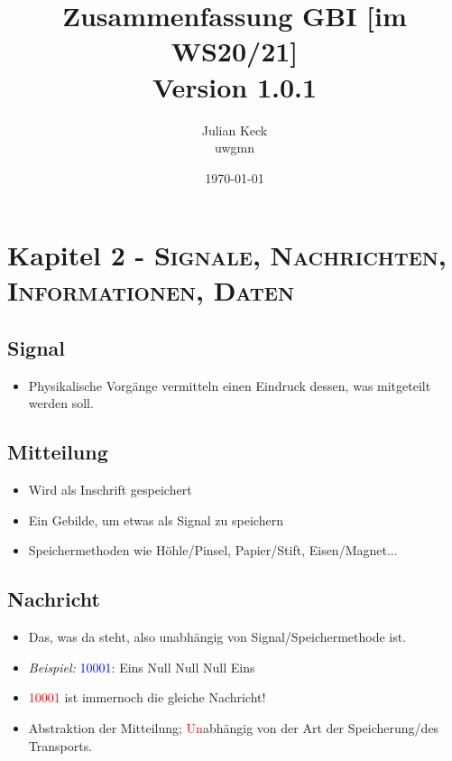 \documentclass{article}
\newcommand{\version}{1.0.1}
\newcommand{\subtitlerelsize}{1} %
\newcommand{\subtitlelinesep}{0.1em} %
\newcommand{\kapitel}[2]{Kapitel #1 - \textsc{#2}}
\newcommand{\blue}[1]{\textcolor{blue}{#1}}
\newcommand{\red}[1]{\textcolor{red}{#1}}
\newcommand{\example}[1]{\textit{Beispiel: }#1}
\begin{document}
\title{Zusammenfassung GBI [im WS20/21]\\[\subtitlelinesep]%
    \smaller[\subtitlerelsize]{}Version \version}
\author{Julian Keck\\uwgmn}
\date{\today}
\maketitle

\tableofcontents

\newpage

\section{\kapitel{2}{Signale, Nachrichten, Informationen, Daten}}
\subsection{Signal}
\begin{itemize}
    \item Physikalische Vorgänge vermitteln einen \dq Eindruck\dq{} dessen, was mitgeteilt werden soll.
\end{itemize}

\subsection{Mitteilung}
\begin{itemize}
    \item Wird als Inschrift gespeichert
    \item Ein Gebilde, um etwas als Signal zu speichern
    \item Speichermethoden wie Höhle/Pinsel, Papier/Stift, Eisen/Magnet...
\end{itemize}

\subsection{Nachricht}
\begin{itemize}
    \item Das, was da steht, also unabhängig von Signal/Speichermethode ist.
    \item \example{\blue{10001}: Eins Null Null Null Eins}
    \item \red{10001} ist immernoch die gleiche Nachricht!
    \item Abstraktion der Mitteilung; \red{Un}abhängig von der Art der Speicherung/des Transports.
\end{itemize}
\end{document}
